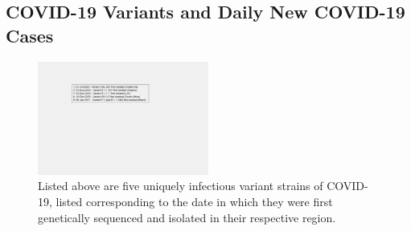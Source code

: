 \documentclass[]{article}
\begin{document}
\subsection{COVID-19 Variants and Daily New COVID-19 Cases}

\begin{figure}[!h]
	\centering
	\includegraphics[width=0.50\textwidth]{legends/variant_strains_legend.png}
	\caption{Listed above are five uniquely infectious variant strains of COVID-19, listed corresponding to the date in which they were first genetically sequenced and isolated in their respective region.   }
	\label{fig:legends/variant_strains_legendLabel}
\end{figure}
\end{document}
